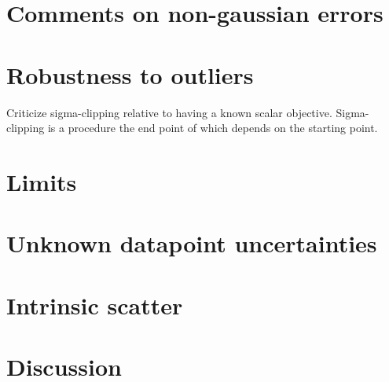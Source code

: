 \documentclass[12pt]{article}
\begin{document}
\section{Comments on non-gaussian errors}

\section{Robustness to outliers}

Criticize sigma-clipping relative to having a known scalar objective.
Sigma-clipping is a procedure the end point of which depends on the
starting point.

\section{Limits}

\section{Unknown datapoint uncertainties}

\section{Intrinsic scatter}

\section{Discussion}
\end{document}
